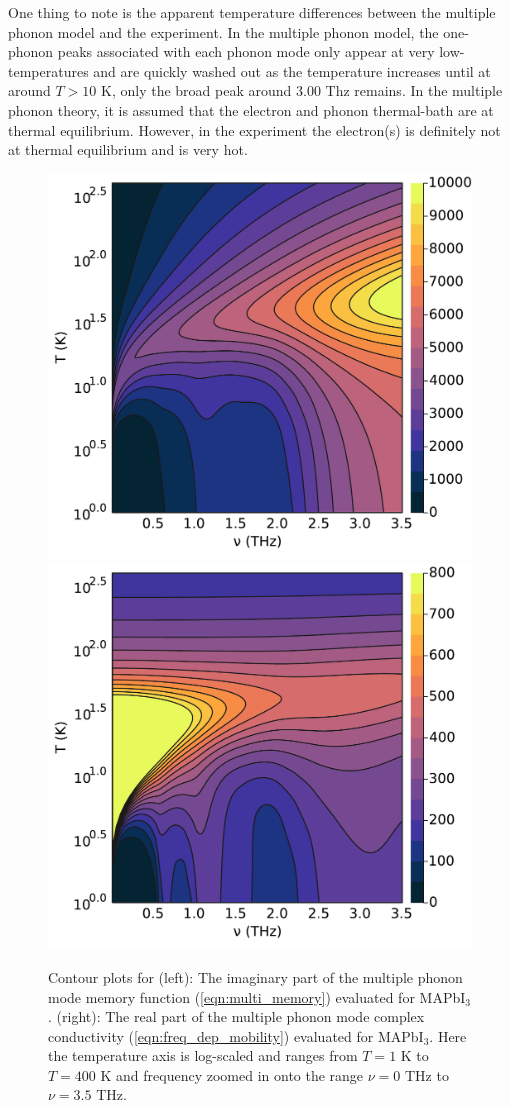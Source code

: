 One thing to note is the apparent temperature differences between the multiple phonon model and the experiment. In the multiple phonon model, the one-phonon peaks associated with each phonon mode only appear at very low-temperatures and are quickly washed out as the temperature increases until at around $T > 10$ K, only the broad peak around $3.00$ Thz remains. In the multiple phonon theory, it is assumed that the electron and phonon thermal-bath are at thermal equilibrium. However, in the experiment the electron(s) is definitely not at thermal equilibrium and is very hot.

\begin{figure}[h]
    \centering
    \includegraphics[width=.49\textwidth]{figures/multi_contour_real_chi.pdf}
    \includegraphics[width=.49\textwidth]{figures/multi_contour_real_0.pdf}
    
    \caption{Contour plots for (left): The imaginary part of the multiple phonon mode memory function (\ref{eqn:multi_memory}) evaluated for MAPbI$_3$. (right): The real part of the multiple phonon mode complex conductivity (\ref{eqn:freq_dep_mobility}) evaluated for MAPbI$_3$. Here the temperature axis is log-scaled and ranges from $T = 1$ K to $T = 400$ K and frequency zoomed in onto the range $\nu = 0$ THz to $\nu = 3.5$ THz.}
    \label{fig:thermal_thz}
\end{figure}


